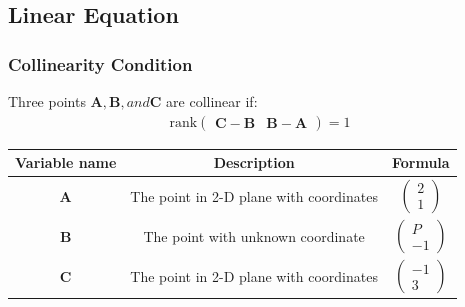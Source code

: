 \documentclass{beamer}
\providecommand{\brak}[1]{\ensuremath{\left(#1\right)}}
\theoremstyle{remark}
\providecommand{\norm}[1]{\lVert#1\rVert}
\newcommand{\myvec}[1]{\ensuremath{\begin{pmatrix}#1\end{pmatrix}}}
\let\vec\mathbf
\numberwithin{equation}{section}
\begin{document}
\subsection{Linear Equation}
\begin{frame}
\frametitle{Collinearity Condition}
Three points $\vec{A} ,\vec{B}, and \vec{C} $ are collinear if:
    \begin{align*}
    \text{rank}\begin{pmatrix} \vec{C}-\vec{B} & \vec{B}-\vec{A} \end{pmatrix} = 1
    \end{align*}
\end{frame}
\begin{frame}
\begin{center}
	\begin{tabular}{|c|c|c|}
    \hline
    \textbf{Variable name} & \textbf{Description} & \textbf{Formula}\\ 
    \hline
	    $\vec{A}$  & The point in 2-D plane with coordinates & $\myvec{2\\ 1}$ \\
    \hline 
	    $\vec{B}$  & The point with unknown coordinate  & $\myvec{P \\ -1}$ \\
    \hline
            $\vec{C}$  & The point in 2-D plane with coordinates & $\myvec{-1\\3}$ \\
    \hline   
    \end{tabular}
\end{center}
\end{frame}
\end{document}
